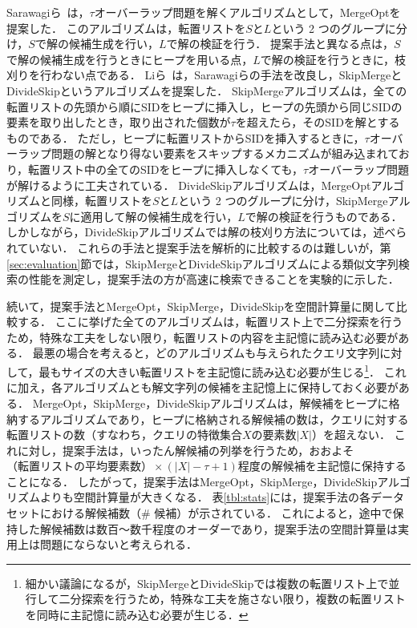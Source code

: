 \documentclass[japanese]{jnlp_JS2.0}
\begin{document}
Sarawagiら~\cite{Sarawagi:04}は，$\tau$オーバーラップ問題を解くアルゴリズムとして，MergeOptを提案した．
このアルゴリズムは，転置リストを$S$と$L$という 2 つのグループに分け，$S$で解の候補生成を行い，$L$で解の検証を行う．
提案手法と異なる点は，$S$で解の候補生成を行うときにヒープを用いる点，$L$で解の検証を行うときに，枝刈りを行わない点である．
Liら~\cite{Li:08}は，Sarawagiらの手法を改良し，SkipMergeとDivideSkipというアルゴリズムを提案した．
SkipMergeアルゴリズムは，全ての転置リストの先頭から順にSIDをヒープに挿入し，ヒープの先頭から同じSIDの要素を取り出したとき，取り出された個数が$\tau$を超えたら，そのSIDを解とするものである．
ただし，ヒープに転置リストからSIDを挿入するときに，$\tau$オーバーラップ問題の解となり得ない要素をスキップするメカニズムが組み込まれており，転置リスト中の全てのSIDをヒープに挿入しなくても，$\tau$オーバーラップ問題が解けるように工夫されている．
DivideSkipアルゴリズムは，MergeOptアルゴリズムと同様，転置リストを$S$と$L$という 2 つのグループに分け，SkipMergeアルゴリズムを$S$に適用して解の候補生成を行い，$L$で解の検証を行うものである．
しかしながら，DivideSkipアルゴリズムでは解の枝刈り方法については，述べられていない．
これらの手法と提案手法を解析的に比較するのは難しいが，第\ref{sec:evaluation}節では，SkipMergeとDivideSkipアルゴリズムによる類似文字列検索の性能を測定し，提案手法の方が高速に検索できることを実験的に示した．

続いて，提案手法とMergeOpt，SkipMerge，DivideSkipを空間計算量に関して比較する．
ここに挙げた全てのアルゴリズムは，転置リスト上で二分探索を行うため，特殊な工夫をしない限り，転置リストの内容を主記憶に読み込む必要がある．
最悪の場合を考えると，どのアルゴリズムも与えられたクエリ文字列に対して，最もサイズの大きい転置リストを主記憶に読み込む必要が生じる\footnote{細かい議論になるが，SkipMergeとDivideSkipでは複数の転置リスト上で並行して二分探索を行うため，特殊な工夫を施さない限り，複数の転置リストを同時に主記憶に読み込む必要が生じる．}．
これに加え，各アルゴリズムとも解文字列の候補を主記憶上に保持しておく必要がある．
MergeOpt，SkipMerge，DivideSkipアルゴリズムは，解候補をヒープに格納するアルゴリズムであり，ヒープに格納される解候補の数は，クエリに対する転置リストの数（すなわち，クエリの特徴集合$X$の要素数$|X|$）を超えない．
これに対し，提案手法は，いったん解候補の列挙を行うため，おおよそ$\mbox{（転置リストの平均要素数）} \times (|X| - \tau + 1)$程度の解候補を主記憶に保持することになる．
したがって，提案手法はMergeOpt，SkipMerge，DivideSkipアルゴリズムよりも空間計算量が大きくなる．
表\ref{tbl:stats}には，提案手法の各データセットにおける解候補数（\# 候補）が示されている．
これによると，途中で保持した解候補数は数百〜数千程度のオーダーであり，提案手法の空間計算量は実用上は問題にならないと考えられる．
\end{document}

